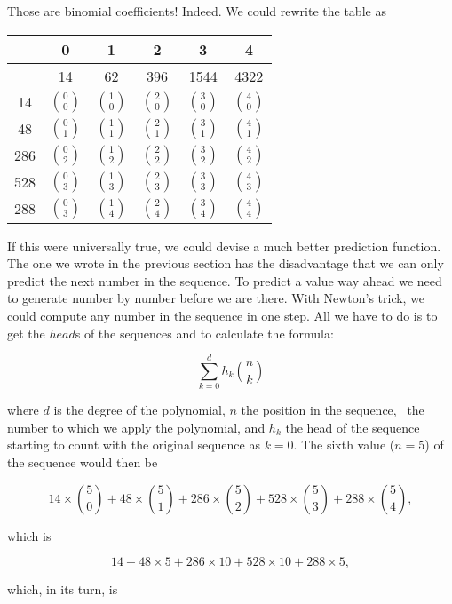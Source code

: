 \documentclass[tikz]{scrreprt}
\newcommand{\Varid}[1]{\mathit{#1}}
\begin{document}
Those are binomial coefficients!
Indeed. We could rewrite the table as

\begin{center}
\begingroup
\renewcommand{\arraystretch}{1.5}
\begin{tabular}{||c||c|c|c|c|c||}
\hline
     &  0 &  1  &  2  &  3   &  4   \\\hline
     & 14         & 62         & 396        & 1544       & 4322       \\\hline\hline
  14 &$\binom{0}{0}$&$\binom{1}{0}$&$\binom{2}{0}$&$\binom{3}{0}$&$\binom{4}{0}$\\\hline
  48 &$\binom{0}{1}$&$\binom{1}{1}$&$\binom{2}{1}$&$\binom{3}{1}$&$\binom{4}{1}$\\\hline
 286 &$\binom{0}{2}$&$\binom{1}{2}$&$\binom{2}{2}$&$\binom{3}{2}$&$\binom{4}{2}$\\\hline
 528 &$\binom{0}{3}$&$\binom{1}{3}$&$\binom{2}{3}$&$\binom{3}{3}$&$\binom{4}{3}$\\\hline
 288 &$\binom{0}{3}$&$\binom{1}{4}$&$\binom{2}{4}$&$\binom{3}{4}$&$\binom{4}{4}$\\\hline
\end{tabular}
\endgroup
\end{center}

If this were universally true, we could devise a 
much better prediction function. The one we wrote
in the previous section has the disadvantage
that we can only predict the next number in the sequence.
To predict a value way ahead we need to generate
number by number before we are there.
With Newton's trick, we could compute any number
in the sequence in one step.
All we have to do is to get the \ensuremath{\Varid{head}}s of the sequences
and to calculate the formula:

\[
\sum_{k=0}^{d}{h_k\binom{n}{k}} 
\]

where $d$ is the degree of the polynomial, $n$
the position in the sequence, \ie\ the number
to which we apply the polynomial, and $h_k$
the head of the sequence starting to count
with the original sequence as $k=0$.
The sixth value ($n=5$) of the sequence would then be

\[
  14 \times \binom{5}{0} + 
  48 \times \binom{5}{1} + 
 286 \times \binom{5}{2} + 
 528 \times \binom{5}{3} + 
 288 \times \binom{5}{4}, 
\]

which is

\[
  14           + 
  48 \times  5 + 
 286 \times 10 + 
 528 \times 10 + 
 288 \times  5, 
\]

which, in its turn, is
\end{document}
